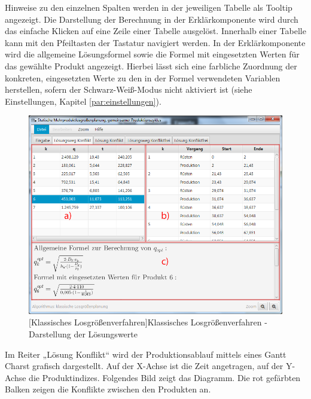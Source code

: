 Hinweise zu den einzelnen Spalten werden in der jeweiligen Tabelle als Tooltip angezeigt.  Die Darstellung der Berechnung in der Erklärkomponente wird durch das einfache Klicken auf eine Zeile einer Tabelle ausgelöst. Innerhalb einer Tabelle kann mit den Pfeiltasten der Tastatur navigiert werden. In der Erklärkomponente wird die allgemeine Lösungsformel sowie die Formel mit eingesetzten Werten für das gewählte Produkt angezeigt. Hierbei lässt sich eine farbliche Zuordnung der konkreten, eingesetzten Werte zu den in der Formel verwendeten Variablen herstellen, sofern der Schwarz-Weiß-Modus nicht aktiviert ist (siehe Einstellungen, Kapitel \ref{par:einstellungen}). 

\begin{figure}[H]
	\centering
	\includegraphics[width=0.8\linewidth]{Bilder/KlassischesVerfahren.png} 
	[Klassisches Losgrößenverfahren]{Klassisches Losgrößenverfahren - Darstellung der Lösungswerte}
	\label{fig:klassich}
\end{figure}

Im Reiter „Lösung Konflikt“ wird der Produktionsablauf mittels eines Gantt Charst grafisch dargestellt. Auf der X-Achse ist die Zeit angetragen, auf der Y-Achse die Produktindizes. Folgendes Bild zeigt das Diagramm. Die rot gefärbten Balken zeigen die Konflikte zwischen den Produkten an.

